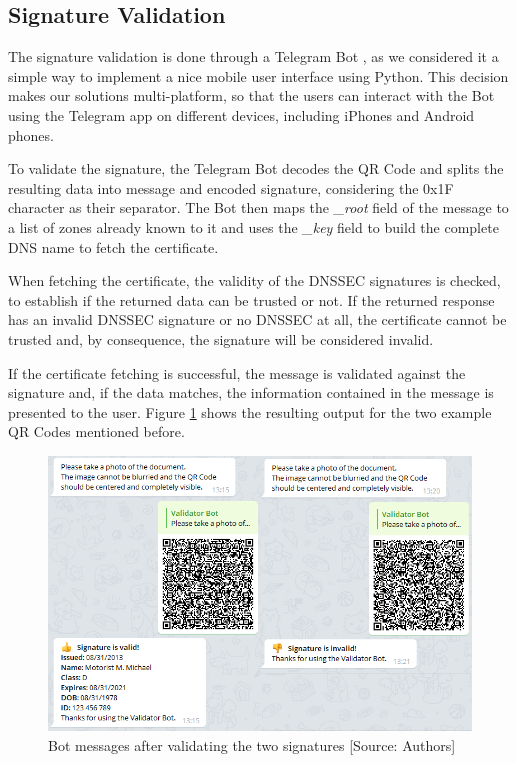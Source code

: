 \documentclass[12pt]{article}
\begin{document}
\subsection{Signature Validation}

The signature validation is done through a Telegram Bot \cite{telegram_bot}, as we considered it a simple way to implement a nice mobile user interface using Python. This decision makes our solutions multi-platform, so that the users can interact with the Bot using the Telegram app on different devices, including iPhones and Android phones.

To validate the signature, the Telegram Bot decodes the QR Code and splits the resulting data into message and encoded signature, considering the 0x1F character as their separator. The Bot then maps the \textit{\_root} field of the message to a list of zones already known to it and uses the \textit{\_key} field to build the complete DNS name to fetch the certificate. 

When fetching the certificate, the validity of the DNSSEC signatures is checked, to establish if the returned data can be trusted or not. If the returned response has an invalid DNSSEC signature or no DNSSEC at all, the certificate cannot be trusted and, by consequence, the signature will be considered invalid. 

If the certificate fetching is successful, the message is validated against the signature and, if the data matches, the information contained in the message is presented to the user. Figure \ref{fig:result} shows the resulting output for the two example QR Codes mentioned before. 

\begin{figure}[ht]
    \centering
    \includegraphics[height=0.38\textheight]{result.png}
    \caption{Bot messages after validating the two signatures [Source: Authors]}
    \label{fig:result}
\end{figure}
\end{document}
